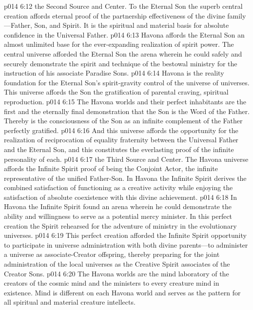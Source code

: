 \pc \vs p014 6:12 \bibnobreakspace {}the Second Source and Center. To the Eternal Son the superb central creation affords eternal proof of the partnership effectiveness of the divine family---Father, Son, and Spirit. It is the spiritual and material basis for absolute confidence in the Universal Father.
\vs p014 6:13 Havona affords the Eternal Son an almost unlimited base for the ever\hyp{}expanding realization of spirit power. The central universe afforded the Eternal Son the arena wherein he could safely and securely demonstrate the spirit and technique of the bestowal ministry for the instruction of his associate Paradise Sons.
\vs p014 6:14 Havona is the reality foundation for the Eternal Son’s spirit\hyp{}gravity control of the universe of universes. This universe affords the Son the gratification of parental craving, spiritual reproduction.
\vs p014 6:15 The Havona worlds and their perfect inhabitants are the first and the eternally final demonstration that the Son is the Word of the Father. Thereby is the consciousness of the Son as an infinite complement of the Father perfectly gratified.
\vs p014 6:16 And this universe affords the opportunity for the realization of reciprocation of equality fraternity between the Universal Father and the Eternal Son, and this constitutes the everlasting proof of the infinite personality of each.
\pc \vs p014 6:17 \bibnobreakspace {}the Third Source and Center. The Havona universe affords the Infinite Spirit proof of being the Conjoint Actor, the infinite representative of the unified Father\hyp{}Son. In Havona the Infinite Spirit derives the combined satisfaction of functioning as a creative activity while enjoying the satisfaction of absolute coexistence with this divine achievement.
\vs p014 6:18 In Havona the Infinite Spirit found an arena wherein he could demonstrate the ability and willingness to serve as a potential mercy minister. In this perfect creation the Spirit rehearsed for the adventure of ministry in the evolutionary universes.
\vs p014 6:19 This perfect creation afforded the Infinite Spirit opportunity to participate in universe administration with both divine parents---to administer a universe as associate\hyp{}Creator offspring, thereby preparing for the joint administration of the local universes as the Creative Spirit associates of the Creator Sons.
\vs p014 6:20 The Havona worlds are the mind laboratory of the creators of the cosmic mind and the ministers to every creature mind in existence. Mind is different on each Havona world and serves as the pattern for all spiritual and material creature intellects.
